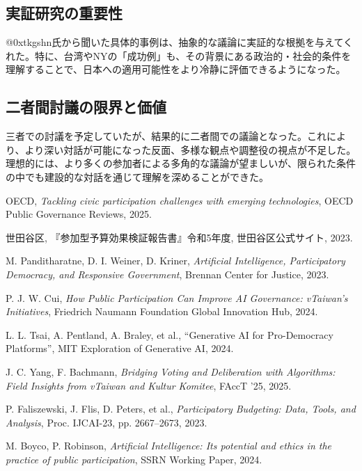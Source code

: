 \documentclass[12pt,a4j]{jarticle}
\begin{document}
\subsection{実証研究の重要性}
@0xtkgshn氏から聞いた具体的事例は、抽象的な議論に実証的な根拠を与えてくれた。特に、台湾やNYの「成功例」も、その背景にある政治的・社会的条件を理解することで、日本への適用可能性をより冷静に評価できるようになった。

\subsection{二者間討議の限界と価値}
三者での討議を予定していたが、結果的に二者間での議論となった。これにより、より深い対話が可能になった反面、多様な観点や調整役の視点が不足した。理想的には、より多くの参加者による多角的な議論が望ましいが、限られた条件の中でも建設的な対話を通じて理解を深めることができた。

\begin{thebibliography}{99}

 OECD, \textit{Tackling civic participation challenges with emerging technologies}, OECD Public Governance Reviews, 2025.

 世田谷区, 『参加型予算効果検証報告書』令和5年度, 世田谷区公式サイト, 2023.

 M. Panditharatne, D. I. Weiner, D. Kriner, \textit{Artificial Intelligence, Participatory Democracy, and Responsive Government}, Brennan Center for Justice, 2023.

 P. J. W. Cui, \textit{How Public Participation Can Improve AI Governance: vTaiwan's Initiatives}, Friedrich Naumann Foundation Global Innovation Hub, 2024.

 L. L. Tsai, A. Pentland, A. Braley, et al., ``Generative AI for Pro-Democracy Platforms'', MIT Exploration of Generative AI, 2024.

 J. C. Yang, F. Bachmann, \textit{Bridging Voting and Deliberation with Algorithms: Field Insights from vTaiwan and Kultur Komitee}, FAccT '25, 2025.

 P. Faliszewski, J. Flis, D. Peters, et al., \textit{Participatory Budgeting: Data, Tools, and Analysis}, Proc. IJCAI-23, pp. 2667–2673, 2023.

 M. Boyco, P. Robinson, \textit{Artificial Intelligence: Its potential and ethics in the practice of public participation}, SSRN Working Paper, 2024.

\end{thebibliography}
\end{document}
